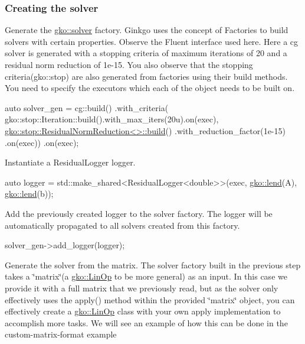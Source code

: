 \label{_Creatingthesolver}%
 \subsubsection*{Creating the solver}

Generate the \hyperlink{namespacegko_1_1solver}{gko\+::solver} factory. Ginkgo uses the concept of Factories to build solvers with certain properties. Observe the Fluent interface used here. Here a cg solver is generated with a stopping criteria of maximum iterations of 20 and a residual norm reduction of 1e-\/15. You also observe that the stopping criteria(gko\+::stop) are also generated from factories using their build methods. You need to specify the executors which each of the object needs to be built on.


\begin{DoxyCode}
\textcolor{keyword}{auto} solver\_gen =
    cg::build()
        .with\_criteria(
            gko::stop::Iteration::build().with\_max\_iters(20u).on(exec),
            \hyperlink{classgko_1_1stop_1_1ResidualNormReduction}{gko::stop::ResidualNormReduction<>::build}()
                .with\_reduction\_factor(1e-15)
                .on(exec))
        .on(exec);
\end{DoxyCode}


Instantiate a Residual\+Logger logger.


\begin{DoxyCode}
\textcolor{keyword}{auto} logger = std::make\_shared<ResidualLogger<double>>(exec, \hyperlink{namespacegko_aa8cb4876b72e5e1036ea9575443c439b}{gko::lend}(A),
                                                       \hyperlink{namespacegko_aa8cb4876b72e5e1036ea9575443c439b}{gko::lend}(b));
\end{DoxyCode}


Add the previously created logger to the solver factory. The logger will be automatically propagated to all solvers created from this factory.


\begin{DoxyCode}
solver\_gen->add\_logger(logger);
\end{DoxyCode}


Generate the solver from the matrix. The solver factory built in the previous step takes a \char`\"{}matrix\char`\"{}(a \hyperlink{classgko_1_1LinOp}{gko\+::\+Lin\+Op} to be more general) as an input. In this case we provide it with a full matrix that we previously read, but as the solver only effectively uses the apply() method within the provided \char`\"{}matrix\char`\"{} object, you can effectively create a \hyperlink{classgko_1_1LinOp}{gko\+::\+Lin\+Op} class with your own apply implementation to accomplish more tasks. We will see an example of how this can be done in the custom-\/matrix-\/format example


